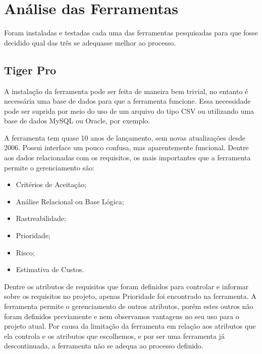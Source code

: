 \section[Análise das Ferramentas]{Análise das Ferramentas}
Foram instaladas e testadas cada uma das ferramentas pesquisadas para que fosse decidido qual das três se adequasse melhor ao processo.

\subsection{Tiger Pro}
A instalação da ferramenta pode ser feita de maneira bem trivial, no entanto é necessária uma base de dados para que a ferramenta funcione. Essa necessidade pode ser suprida por meio do uso de um arquivo do tipo CSV ou utilizando uma base de dados MySQL ou Oracle, por exemplo.

A ferramenta tem quase 10 anos de lançamento, sem novas atualizações desde 2006. Possui interface um pouco confusa, mas aparentemente funcional. Dentre aos dados relacionadas com os requisitos, os mais importantes que a ferramenta permite o gerenciamento são:
\begin{itemize}
  \item Critérios de Aceitação;
  \item Análise Relacional ou Base Lógica;
  \item Rastreabilidade;
  \item Prioridade;
  \item Risco;
  \item Estimativa de Custos.
\end{itemize}

Dentre os atributos de requisitos que foram definidos para controlar e informar sobre os requisitos no projeto, apenas Prioridade foi encontrado na ferramenta.
A ferramenta permite o gerenciamento de outros atributos, porém estes outros não foram definidos previamente e nem observamos vantagens no seu uso para o projeto atual.
Por causa da limitação da ferramenta em relação aos atributos que ela controla e os atributos que escolhemos, e por ser uma ferramenta já descontinuada, a ferramenta não
se adequa ao processo definido.

